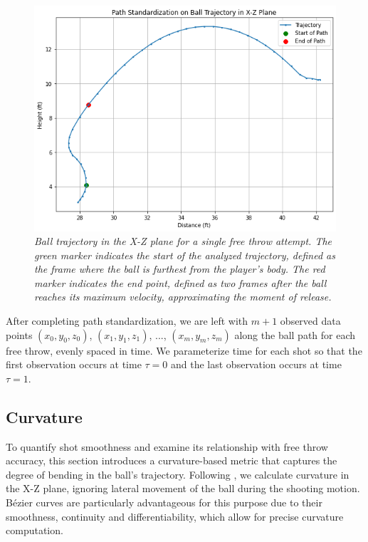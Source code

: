 \documentclass{article}
\begin{document}
      \begin{figure}[H]
        \centering
        \includegraphics[scale=0.4]{articles/figures/path_standardization.png}
        \caption{\it Ball trajectory in the X-Z plane for a single free throw attempt. The green marker indicates the start of the analyzed trajectory, defined as the frame where the ball is furthest from the player’s body. The red marker indicates the end point, defined as two frames after the ball reaches its maximum velocity, approximating the moment of release.}
        \label{fig:path-standardization}
      \end{figure}

      After completing path standardization, we are left with $m + 1$ observed data points \((x_0, y_0, z_0)\), \((x_1, y_1, z_1)\), ..., \((x_m, y_m, z_m)\) along the ball path for each free throw, evenly spaced in time. We parameterize time for each shot so that the first observation occurs at time $\tau = 0$ and the last observation occurs at time $\tau = 1$.

    \subsection{Curvature}
    \label{sec:curvature}
    
    To quantify shot smoothness and examine its relationship with free throw accuracy, this section introduces a curvature-based metric that captures the degree of bending in the ball's trajectory. Following \citet{slegers_role_2024}, we calculate curvature in the X-Z plane, ignoring lateral movement of the ball during the shooting motion. Bézier curves are particularly advantageous for this purpose due to their smoothness, continuity and differentiability, which allow for precise curvature computation. 
\end{document}
